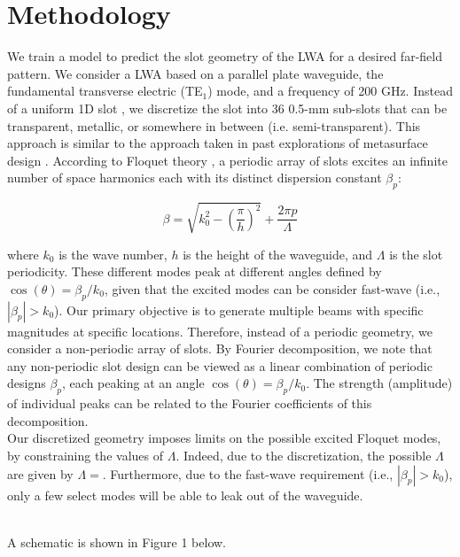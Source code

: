 \documentclass[11pt]{article}
\begin{document}
\section*{Methodology}

We train a model to predict the slot geometry of the LWA for a desired far-field pattern. We consider a LWA based on a parallel plate waveguide, the fundamental transverse electric (TE$_1$) mode, and a frequency of 200 GHz. Instead of a uniform 1D slot \cite{doi:10.1063/5.0033126}, we discretize the slot into 36 0.5-mm sub-slots that can be transparent, metallic, or somewhere in between (i.e. semi-transparent). This approach is similar to the approach taken in past explorations of metasurface design \cite{Liu:2022tg, Jafar-Zanjani:2018vy}. According to Floquet theory \cite{6556051}, a periodic array of slots excites an infinite number of space harmonics each with its distinct dispersion constant $\beta_p$:

\[\beta=\sqrt{k_0^2 - (\frac{\pi}{h})^2} +\frac{2\pi p}{\Lambda} \tag{1} \label{eq:special}\] 

\noindent where $k_0$ is the wave number, $h$ is the height of the waveguide, and $\Lambda$ is the slot periodicity. These different modes peak at different angles defined by $\cos(\theta)=\beta_p/k_0$, given that the excited modes can be consider fast-wave (i.e., $|\beta_p|>k_0$). Our primary objective is to generate multiple beams with specific magnitudes at specific locations. Therefore, instead of a periodic geometry, we consider a non-periodic array of slots. By Fourier decomposition, we note that any non-periodic slot design can be viewed as a linear combination of periodic designs $\beta_p$, each peaking at an angle $\cos(\theta)=\beta_p/k_0$. The strength (amplitude) of individual peaks can be related to the Fourier coefficients of this decomposition. \\

\noindent Our discretized geometry imposes limits on the possible excited Floquet modes, by constraining the values of $\Lambda$. Indeed, due to the discretization, the possible $\Lambda$ are given by $\Lambda=$. Furthermore, due to the fast-wave requirement (i.e., $|\beta_p|>k_0$), only a few select modes will be able to leak out of the waveguide. 

\\ A schematic is shown in Figure 1 below. \\
\end{document}
